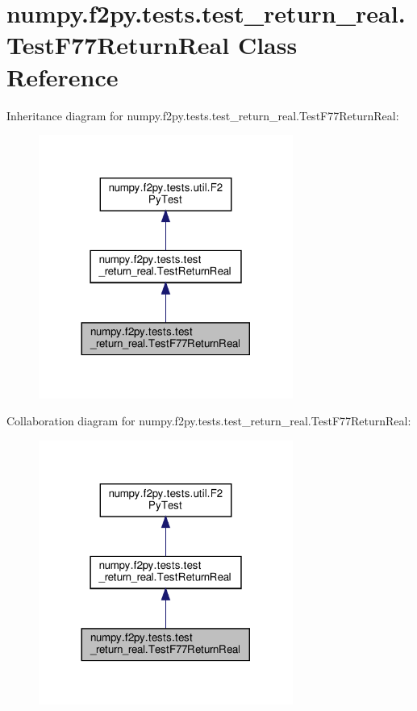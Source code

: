 \hypertarget{classnumpy_1_1f2py_1_1tests_1_1test__return__real_1_1TestF77ReturnReal}{}\section{numpy.\+f2py.\+tests.\+test\+\_\+return\+\_\+real.\+Test\+F77\+Return\+Real Class Reference}
\label{classnumpy_1_1f2py_1_1tests_1_1test__return__real_1_1TestF77ReturnReal}


Inheritance diagram for numpy.\+f2py.\+tests.\+test\+\_\+return\+\_\+real.\+Test\+F77\+Return\+Real\+:
\nopagebreak
\begin{figure}[H]
\begin{center}
\leavevmode
\includegraphics[width=236pt]{classnumpy_1_1f2py_1_1tests_1_1test__return__real_1_1TestF77ReturnReal__inherit__graph}
\end{center}
\end{figure}


Collaboration diagram for numpy.\+f2py.\+tests.\+test\+\_\+return\+\_\+real.\+Test\+F77\+Return\+Real\+:
\nopagebreak
\begin{figure}[H]
\begin{center}
\leavevmode
\includegraphics[width=236pt]{classnumpy_1_1f2py_1_1tests_1_1test__return__real_1_1TestF77ReturnReal__coll__graph}
\end{center}
\end{figure}
